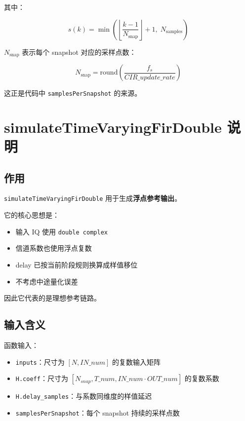 \documentclass[12pt,a4paper]{article}
\begin{document}
其中：

\begin{equation}
s(k) = \min\left(\left\lfloor \frac{k-1}{N_{\text{snap}}} \right\rfloor + 1,\; N_{\text{samples}}\right)
\end{equation}

$N_{\text{snap}}$ 表示每个 snapshot 对应的采样点数：

\begin{equation}
N_{\text{snap}} = \mathrm{round}\!\left(\frac{f_s}{CIR\_update\_rate}\right)
\end{equation}

这正是代码中 \texttt{samplesPerSnapshot} 的来源。

\section{simulateTimeVaryingFirDouble 说明}

\subsection{作用}

\texttt{simulateTimeVaryingFirDouble} 用于生成\textbf{浮点参考输出}。

它的核心思想是：

\begin{itemize}
\item 输入 IQ 使用 \texttt{double complex}
\item 信道系数也使用浮点复数
\item delay 已按当前阶段规则换算成样值移位
\item 不考虑中途量化误差
\end{itemize}

因此它代表的是理想参考链路。

\subsection{输入含义}

函数输入：

\begin{itemize}
\item \texttt{inputs}：尺寸为 $[N, IN\_num]$ 的复数输入矩阵
\item \texttt{H.coeff}：尺寸为 $[N_{snap}, T\_num, IN\_num\cdot OUT\_num]$ 的复数系数
\item \texttt{H.delay\_samples}：与系数同维度的样值延迟
\item \texttt{samplesPerSnapshot}：每个 snapshot 持续的采样点数
\end{itemize}
\end{document}
